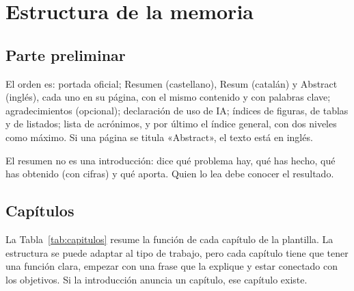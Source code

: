 \documentclass[11pt,a4paper]{article}
\begin{document}
\section{Estructura de la memoria}
\label{sec:estructura}

\subsection{Parte preliminar}

El orden es: portada oficial; Resumen (castellano), Resum (catalán) y Abstract
(inglés), cada uno en su página, con el mismo contenido y con palabras clave;
agradecimientos (opcional); declaración de uso de IA; índices de figuras, de
tablas y de listados; lista de acrónimos, y por último el índice general, con
dos niveles como máximo. Si una página se titula «Abstract», el texto está en
inglés.

El resumen no es una introducción: dice qué problema hay, qué has hecho, qué
has obtenido (con cifras) y qué aporta. Quien lo lea debe conocer el resultado.

\subsection{Capítulos}

La Tabla~\ref{tab:capitulos} resume la función de cada capítulo de la plantilla.
La estructura se puede adaptar al tipo de trabajo, pero cada capítulo tiene que
tener una función clara, empezar con una frase que la explique y estar conectado
con los objetivos. Si la introducción anuncia un capítulo, ese capítulo existe.
\end{document}
